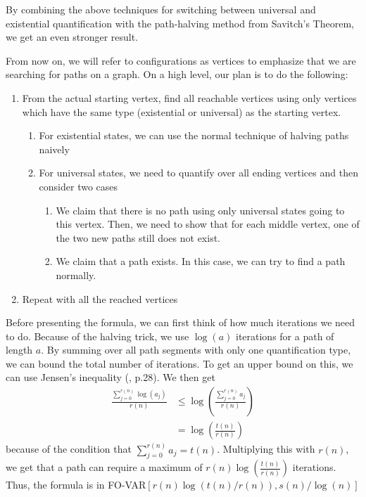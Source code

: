 By combining the above techniques for switching between universal and existential quantification with the path-halving method from Savitch's Theorem, we get an even stronger result.

From now on, we will refer to configurations as vertices to emphasize that we are searching for paths on a graph.
On a high level, our plan is to do the following:
\begin{enumerate}
    \setlength\itemsep{0.2em}
    \item From the actual starting vertex, find all reachable vertices using only vertices which have the same type (existential or universal) as the starting vertex.
    \begin{enumerate}
        \item For existential states, we can use the normal technique of halving paths naively
        \item For universal states, we need to quantify over all ending vertices and then consider two cases
        \begin{enumerate}
            \item We claim that there is no path using only universal states going to this vertex.
            Then, we need to show that for each middle vertex, one of the two new paths still does not exist.
            \item We claim that a path exists.
            In this case, we can try to find a path normally.
        \end{enumerate}
    \end{enumerate}
    \item Repeat with all the reached vertices
\end{enumerate}

Before presenting the formula, we can first think of how much iterations we need to do.
Because of the halving trick, we use $\log(a)$ iterations for a path of length $a$.
By summing over all path segments with only one quantification type, we can bound the total number of iterations.
To get an upper bound on this, we can use Jensen's inequality (\cite{inequalities-math-oly}, p.28).
We then get
\[
    \begin{aligned}
        \frac{\sum_{j = 0}^{r(n)}\log(a_{j})}{r(n)} &\leq \log\left(\frac{\sum_{j= 0}^{r(n)}a_{j}}{r(n)} \right)  \\
        &= \log\left(\frac{t(n)}{r(n)} \right)
    \end{aligned}
\]
because of the condition that $\sum_{j= 0}^{r(n)}a_{j} = t(n)$.
Multiplying this with $r(n)$, we get that a path can require a maximum of $r(n)\log\left(\frac{t(n)}{r(n)} \right)$ iterations.
Thus, the formula is in FO-VAR$\left[r(n)\log\left(t(n)/r(n) \right), s(n)/\log(n) \right]$


